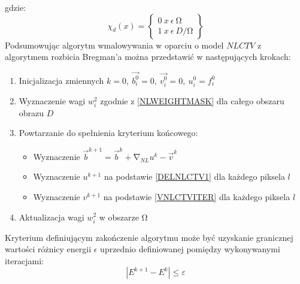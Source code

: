 \documentclass[12pt, twoside, openany]{report}
\theoremstyle{definition}
\begin{document}
gdzie:
\begin{equation}
{\chi }_d\left(x\right)=\left\{ \begin{array}{c}
0\ x\ \epsilon \ \mathrm{\Omega } \\ 
1\ x\ \epsilon \ D/\mathrm{\Omega } \end{array}
\right\}
\end{equation}
Podsumowując algorytm wmalowywania w oparciu o model $NLCTV$ z algorytmem rozbicia Bregman’a można przedstawić w następujących krokach:
\begin{enumerate}
\item  
Inicjalizacja zmiennych $k=0,\ \overrightarrow{b^0_i}=0,\ \overrightarrow{v^0_i}=0,\ u^0_i=f^0_i$ 
\item  
Wyznaczenie wagi $w^2_i$ zgodnie z \eqref{NLWEIGHTMASK} dla całego obszaru obrazu $D$
\item  
Powtarzanie do spełnienia kryterium końcowego:
\begin{itemize}
\item
\noindent Wyznaczenie ${\overrightarrow{b}}^{k+1}={\overrightarrow{b}}^k+{\mathrm{\nabla }}_{NL}u^k-{\overrightarrow{v}}^k$
\item
\noindent Wyznaczenie $u^{k+1}$ na podstawie \eqref{DELNLCTV1} dla każdego piksela $l$
\item
\noindent Wyznaczenie $v^{k+1}$ na podstawie \eqref{VNLCTVITER} dla każdego piksela $l$
\end{itemize}
\item  
Aktualizacja wagi $w^2_i$ w obszarze $\mathrm{\Omega }$
\end{enumerate}
Kryterium definiującym zakończenie algorytmu może być uzyskanie granicznej wartości różnicy energii $\epsilon$ uprzednio definiowanej pomiędzy wykonywanymi iteracjami:
\begin{equation}
\left|E^{k+1}-E^k\right|\le \varepsilon
\end{equation}
\end{document}

